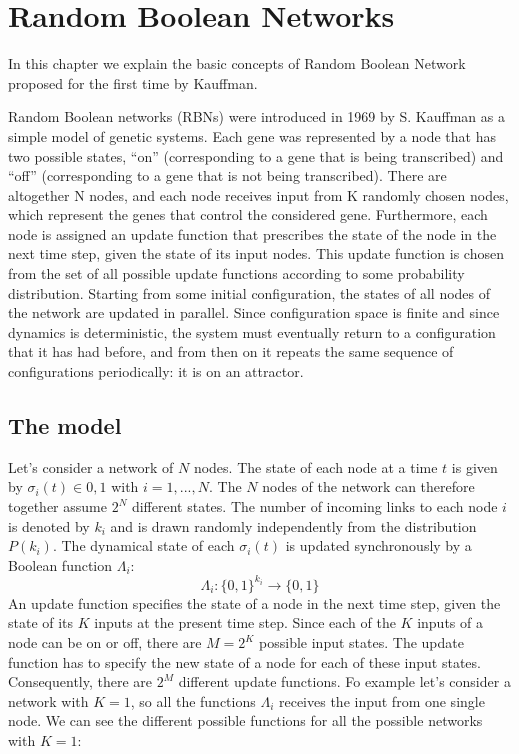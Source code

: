 \chapter{Random Boolean Networks}
\lhead[\fancyplain{}{\bfseries\thepage}]{\fancyplain{}{\bfseries\rightmark}}

\newenvironment{sistema}%
{\left\lbrace\begin{array}{@{}l@{}}}%
{\end{array}\right.}
In this chapter we explain the basic concepts of Random Boolean Network proposed for the first time by Kauffman.


Random Boolean networks (RBNs) were introduced in
1969 by S. Kauffman as a simple model of genetic systems.
Each gene was represented by a node
that has two possible states, “on” (corresponding to a
gene that is being transcribed) and “off” (corresponding
to a gene that is not being transcribed). There are altogether N nodes, and each node receives input from K
randomly chosen nodes, which represent the genes that
control the considered gene. Furthermore, each node is
assigned an update function that prescribes the state of
the node in the next time step, given the state of its input nodes. This update function is chosen from the set
of all possible update functions according to some probability distribution. Starting from some initial configuration, the states of all nodes of the network are updated
in parallel. Since configuration space is finite and since
dynamics is deterministic, the system must eventually return to a configuration that it has had before, and from
then on it repeats the same sequence of configurations
periodically: it is on an attractor.

\section{The model}
Let's consider a network of $N$ nodes. The state of each node at a time $t$ is given by $\sigma_i(t) \in {0,1}$ with $ i = 1,...,N$.
The $N$ nodes of the network can therefore together assume $2^N$ different states.
The number of incoming links to each node $i$  is denoted by $k_i$ and is drawn
randomly independently from the distribution $P(k_i)$.
The dynamical state of each $\sigma_i(t)$ is updated synchronously by a Boolean function $\Lambda_i$:
$$
\Lambda_i:\{0,1\}^{k_i} \to \{0,1\}
$$ 
An update function specifies
the state of a node in the next time step, given the state
of its $K$ inputs at the present time step. Since each of the
$K$ inputs of a node can be on or off, there are $M = 2^K$ possible input states.
The update function has to specify the new state of a node for each of these input states.
Consequently, there are $2^M$ different update functions.
Fo example let's consider a network with $K=1$, so all the functions $\Lambda_i$ receives the input from one single node. We can see the different possible functions for all the possible networks with $K=1$:

